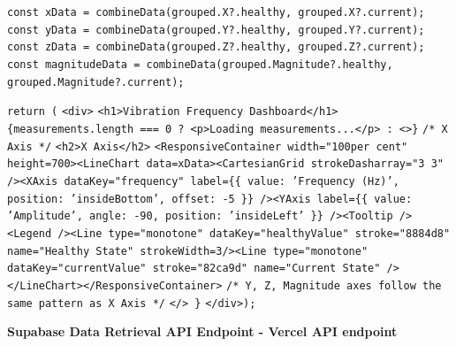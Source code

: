 \begin{algorithmic}[1]
	\STATE
	\STATE \hspace{0.5cm} \texttt{const xData = combineData(grouped.X?.healthy, grouped.X?.current);}
	\STATE \hspace{0.5cm} \texttt{const yData = combineData(grouped.Y?.healthy, grouped.Y?.current);}
	\STATE \hspace{0.5cm} \texttt{const zData = combineData(grouped.Z?.healthy, grouped.Z?.current);}
	\STATE \hspace{0.5cm} \texttt{const magnitudeData = combineData(grouped.Magnitude?.healthy, grouped.Magnitude?.current);}
	
	\STATE
	\STATE \hspace{0.5cm} \texttt{return (}
	\STATE \hspace{1.0cm} \texttt{<div>}
	\STATE \hspace{1.5cm} \texttt{<h1>Vibration Frequency Dashboard</h1>}
	\STATE \hspace{1.5cm} \texttt{\{measurements.length === 0 ? <p>Loading measurements...</p> : <>\}}
	\STATE \hspace{2.0cm} \texttt{/* X Axis */} 
	\STATE \hspace{2.0cm} \texttt{<h2>X Axis</h2>}
	\STATE \hspace{2.0cm} \texttt{<ResponsiveContainer width="100per cent" height={700}><LineChart data={xData}><CartesianGrid strokeDasharray="3 3" /><XAxis dataKey="frequency" label=\{\{ value: 'Frequency (Hz)', position: 'insideBottom', offset: -5 \}\} /><YAxis label=\{\{ value: 'Amplitude', angle: -90, position: 'insideLeft' \}\} /><Tooltip /><Legend /><Line type="monotone" dataKey="healthyValue" stroke="8884d8" name="Healthy State" strokeWidth={3}/><Line type="monotone" dataKey="currentValue" stroke="82ca9d" name="Current State" /></LineChart></ResponsiveContainer>}
	\STATE \hspace{1.5cm} \texttt{/* Y, Z, Magnitude axes follow the same pattern as X Axis */}
	\STATE \hspace{1.0cm} \texttt{</> \}}
	\STATE \hspace{1.0cm} \texttt{</div>);}
\end{algorithmic}


\clearpage



\noindent\textbf{Supabase Data Retrieval API Endpoint - Vercel API endpoint}

